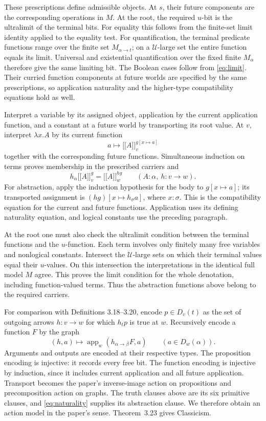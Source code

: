 \documentclass[12pt,leqno]{article}
\newcommand{\U}{\mathcal U}
\begin{document}
These prescriptions define admissible objects. At $s$, their future
components are the corresponding operations in $M$. At the root,
the required $u$-bit is the ultralimit of the terminal bits.
For equality this follows from the finite-set limit identity applied
to the equality test. For quantification, the terminal predicate
functions range over the finite set $M_{\alpha\to t}$; on a
$\U$-large set the entire function equals its limit. Universal and
existential quantification over the fixed finite $M_\alpha$ therefore
give the same limiting bit. The Boolean cases follow from
\eqref{eq:limit}. Their curried function components at future worlds
are specified by the same prescriptions, so application naturality and
the higher-type compatibility equations hold as well.

Interpret a variable by its assigned object, application by the current
application function, and a constant at a future world by transporting
its root value. At $v$, interpret $\lambda x.A$ by its current function
\[
 a\longmapsto\lbrack\!\lbrack A\rbrack\!\rbrack_v^{g[x\mapsto a]}
\]
together with the corresponding future functions. Simultaneous
induction on terms proves membership in the prescribed carriers and
\begin{equation}\label{eq:naturality}
 h_\alpha\lbrack\!\lbrack A\rbrack\!\rbrack_v^g
       =\lbrack\!\lbrack A\rbrack\!\rbrack_w^{hg}
       \qquad(A:\alpha,\ h:v\to w).
\end{equation}
For abstraction, apply the induction hypothesis for the body
to $g[x\mapsto a]$; its transported assignment is
$(hg)[x\mapsto h_\sigma a]$, where $x:\sigma$. This is the
compatibility equation for the current and future functions.
Application uses its defining naturality equation, and logical
constants use the preceding paragraph.

At the root one must also check the ultralimit condition between
the terminal functions and the $u$-function. Each term involves only
finitely many free variables and nonlogical constants. Intersect the
$\U$-large sets on which their terminal values equal their $u$-values.
On this intersection the interpretations in the identical full model
$M$ agree. This proves the limit condition for the whole denotation,
including function-valued terms. Thus the abstraction functions above
belong to the required carriers.

For comparison with Definitions 3.18--3.20, encode $p\in D_v(t)$
as the set of outgoing arrows $h:v\to w$ for which $h_t p$ is
true at $w$. Recursively encode a function $F$ by the graph
\[
 (h,a)\longmapsto\operatorname{app}_w(h_{\alpha\to\beta}F,a)
       \qquad(a\in D_w(\alpha)).
\]
Arguments and outputs are encoded at their respective types.
The proposition encoding is injective: it records every free bit.
The function encoding is injective by induction, since it includes
current application and all future application. Transport becomes
the paper's inverse-image action on propositions and precomposition
action on graphs. The truth clauses above are its six primitive
clauses, and \eqref{eq:naturality} supplies its abstraction clause.
We therefore obtain an action model in the paper's sense.
Theorem~3.23 gives Classicism.
\end{document}
